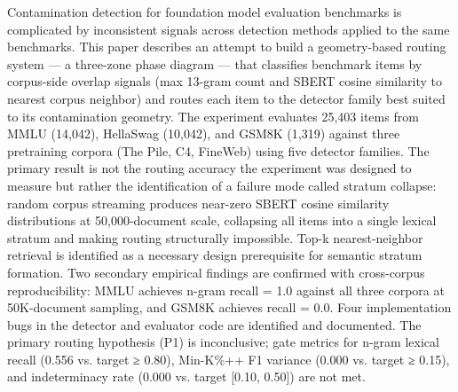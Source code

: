 
Contamination detection for foundation model evaluation benchmarks is complicated by inconsistent signals across detection methods applied to the same benchmarks. This paper describes an attempt to build a geometry-based routing system — a three-zone phase diagram — that classifies benchmark items by corpus-side overlap signals (max 13-gram count and SBERT cosine similarity to nearest corpus neighbor) and routes each item to the detector family best suited to its contamination geometry. The experiment evaluates 25,403 items from MMLU (14,042), HellaSwag (10,042), and GSM8K (1,319) against three pretraining corpora (The Pile, C4, FineWeb) using five detector families. The primary result is not the routing accuracy the experiment was designed to measure but rather the identification of a failure mode called stratum collapse: random corpus streaming produces near-zero SBERT cosine similarity distributions at 50,000-document scale, collapsing all items into a single lexical stratum and making routing structurally impossible. Top-k nearest-neighbor retrieval is identified as a necessary design prerequisite for semantic stratum formation. Two secondary empirical findings are confirmed with cross-corpus reproducibility: MMLU achieves n-gram recall = 1.0 against all three corpora at 50K-document sampling, and GSM8K achieves recall = 0.0. Four implementation bugs in the detector and evaluator code are identified and documented. The primary routing hypothesis (P1) is inconclusive; gate metrics for n-gram lexical recall (0.556 vs. target ≥ 0.80), Min-K\%++ F1 variance (0.000 vs. target ≥ 0.15), and indeterminacy rate (0.000 vs. target [0.10, 0.50]) are not met.

